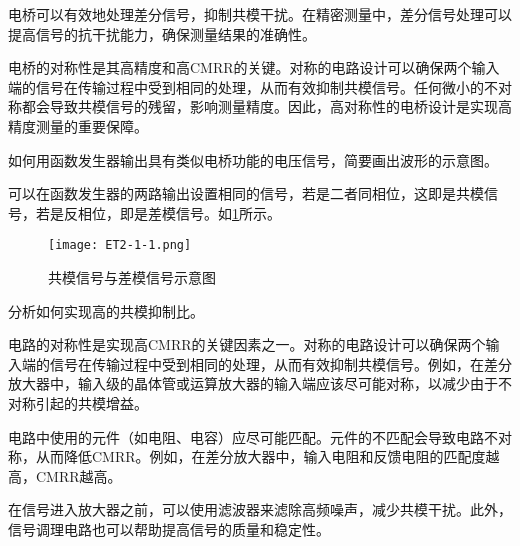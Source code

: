 	电桥可以有效地处理差分信号，抑制共模干扰。在精密测量中，差分信号处理可以提高信号的抗干扰能力，确保测量结果的准确性。

	电桥的对称性是其高精度和高CMRR的关键。对称的电路设计可以确保两个输入端的信号在传输过程中受到相同的处理，从而有效抑制共模信号。任何微小的不对称都会导致共模信号的残留，影响测量精度。因此，高对称性的电桥设计是实现高精度测量的重要保障。

	


\begin{question}
	如何用函数发生器输出具有类似电桥功能的电压信号，简要画出波形的示意图。
\end{question}

	可以在函数发生器的两路输出设置相同的信号，若是二者同相位，这即是共模信号，若是反相位，即是差模信号。如\cref{fig:ET2-1-1}所示。

	\begin{figure}[htbp]
		\centering
		\texttt{[image: ET2-1-1.png]}
		\caption{共模信号与差模信号示意图}
		\label{fig:ET2-1-1}
	\end{figure}

\begin{question}
	分析如何实现高的共模抑制比。
\end{question}

	电路的对称性是实现高CMRR的关键因素之一。对称的电路设计可以确保两个输入端的信号在传输过程中受到相同的处理，从而有效抑制共模信号。例如，在差分放大器中，输入级的晶体管或运算放大器的输入端应该尽可能对称，以减少由于不对称引起的共模增益。

	电路中使用的元件（如电阻、电容）应尽可能匹配。元件的不匹配会导致电路不对称，从而降低CMRR。例如，在差分放大器中，输入电阻和反馈电阻的匹配度越高，CMRR越高。

	在信号进入放大器之前，可以使用滤波器来滤除高频噪声，减少共模干扰。此外，信号调理电路也可以帮助提高信号的质量和稳定性。






	
	
	
	

